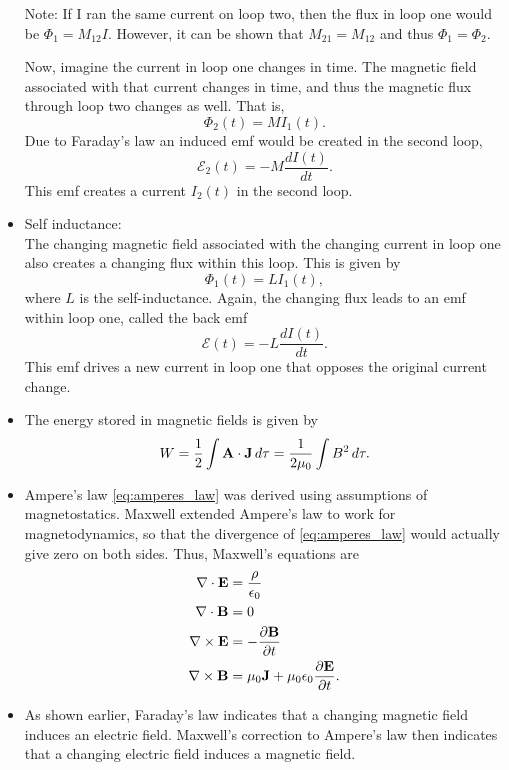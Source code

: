 \documentclass[11pt]{article}
\begin{document}
\begin{itemize}
Note: If I ran the same current on loop two, then the flux in loop one would be $\Phi_1 = M_{12} I$. However, it can be shown that $M_{21} = M_{12}$ and thus $\Phi_1 = \Phi_2$.

Now, imagine the current in loop one changes in time. The magnetic field associated with that current changes in time, and thus the magnetic flux through loop two changes as well. That is,
\begin{equation}
\Phi_2(t) = M I_1(t).
\end{equation}
Due to Faraday's law an induced emf would be created in the second loop, \begin{equation}
\mathcal{E}_2(t) = - M \frac{d I(t)}{dt}.
\end{equation}
This emf creates a current $I_2(t)$ in the second loop.

\item Self inductance:\\
The changing magnetic field associated with the changing current in loop one also creates a changing flux within this loop. This is given by
\begin{equation}
\Phi_1(t) = L I_1(t),
\end{equation}
where $L$ is the self-inductance. Again, the changing flux leads to an emf within loop one, called the back emf
\begin{equation}
\mathcal{E}(t) = - L \frac{d I(t)}{dt}.
\end{equation}
This emf drives a new current in loop one that opposes the original current change.

\item The energy stored in magnetic fields is given by
\begin{equation}
W = \frac{1}{2} \int \mathbf{A} \cdot \mathbf{J} \, d\tau = \frac{1}{2\mu_0} \int B^2 \, d\tau.
\end{equation}

\item Ampere's law \cref{eq:amperes_law} was derived using assumptions of magnetostatics. Maxwell extended Ampere's law to work for magnetodynamics, so that the divergence of \cref{eq:amperes_law} would actually give zero on both sides. Thus, Maxwell's equations are
\begin{align}
\nabla \cdot \mathbf{E} &= \frac{\rho}{\epsilon_0} \\
\nabla \cdot \mathbf{B} &= 0 \\
\nabla \times \mathbf{E} &= -\frac{ \partial \mathbf{B}}{\partial t} \\
\nabla \times \mathbf{B} &= \mu_0 \mathbf{J} + \mu_0 \epsilon_0 \frac{\partial \mathbf{E}}{ \partial t}.
\end{align}

\item As shown earlier, Faraday's law indicates that a changing magnetic field induces an electric field. Maxwell's correction to Ampere's law then indicates that a changing electric field induces a magnetic field. 

\end{itemize}
\end{document}
